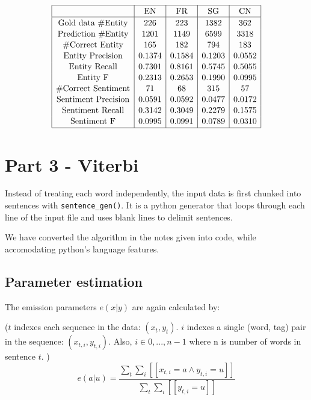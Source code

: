\documentclass[12pt]{article}
\begin{document}
\[
\begin{array}{|c|c|c|c|c|}
\hline \rule{0pt}{1em}
& \mbox{EN} & \mbox{FR} & \mbox{SG} & \mbox{CN} \\
\hline \rule{0pt}{1em}
\mbox{Gold data \#Entity} & 226    & 223    & 1382   & 362    \\[0.1em]
\mbox{Prediction \#Entity}& 1201   & 1149   & 6599   & 3318   \\[0.1em]
\mbox{\#Correct Entity}   & 165    & 182    & 794    & 183    \\[0.1em]
\mbox{Entity Precision}   & 0.1374 & 0.1584 & 0.1203 & 0.0552 \\[0.1em]
\mbox{Entity Recall}      & 0.7301 & 0.8161 & 0.5745 & 0.5055 \\[0.1em]
\mbox{Entity F}           & 0.2313 & 0.2653 & 0.1990 & 0.0995 \\[0.1em]
\mbox{\#Correct Sentiment}& 71     & 68     & 315    & 57     \\[0.1em]
\mbox{Sentiment Precision}& 0.0591 & 0.0592 & 0.0477 & 0.0172 \\[0.1em]
\mbox{Sentiment Recall}   & 0.3142 & 0.3049 & 0.2279 & 0.1575 \\[0.1em]
\mbox{Sentiment F}        & 0.0995 & 0.0991 & 0.0789 & 0.0310 \\[0.1em] 
\hline
\end{array}
\]



\pagebreak

\section{Part 3 - Viterbi}

Instead of treating each word independently, the input data is first chunked into sentences with \verb|sentence_gen()|. It is a python generator that loops through each line of the input file and uses blank lines to delimit sentences.

We have converted the algorithm in the notes given into code, while accomodating python's language features.

\subsection{Parameter estimation}

The emission parameters \(e(x|y)\) are again calculated by:

(\(t\) indexes each sequence in the data: \((x_t, y_t)\). \(i\) indexes a single (word, tag) pair in the sequence: \((x_{t,i}, y_{t,i})\). Also, \(i \in {0,...,n-1}\) where n is number of words in sentence \(t\). )
\[ e(a|u) = \frac{\sum_t \sum_i [[x_{t,i}=a \land y_{t,i}=u]] }{\sum_{t} \sum_i [[y_{t,i}=u]] } \]
\end{document}
